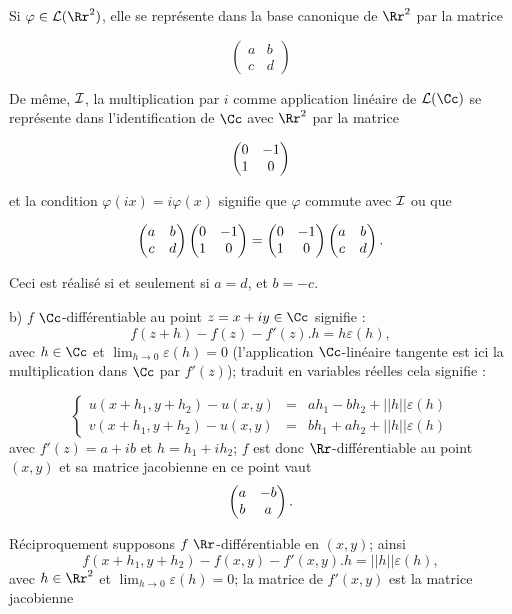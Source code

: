 {\begin{enumerate}
{\medskip

Si $\varphi\in{\cal L}(\Rr^2)$, elle se représente dans la base canonique
de $\Rr^2$ par la matrice 

$$\begin{pmatrix}a&b\\ c&d \end{pmatrix}$$

De même, $\cal I$, la multiplication par $i$ comme application linéaire de 
${\cal L}(\Cc)$ se représente dans l'identification de $\Cc$ avec $\Rr^2$
par la matrice

$$\begin{pmatrix}0&-1\cr 1&0 \cr \end{pmatrix}$$

et la condition  $\varphi(ix)=i\varphi(x)$ signifie que $\varphi$ commute
avec $\cal I$ ou que 

$$\begin{pmatrix}a&b\cr c&d \cr\end{pmatrix}
\begin{pmatrix}0&-1\cr 1&0 \cr \end{pmatrix}=
\begin{pmatrix}0&-1\cr 1&0 \cr\end{pmatrix}
\begin{pmatrix}a&b\cr c&d \cr \end{pmatrix}.$$

Ceci est réalisé si et seulement si $a=d$, et $b=-c$.

\smallskip

b) $f$ $\Cc$-différentiable au point $z=x+iy\in \Cc$ signifie : 
$$f(z+h)-f(z)-f'(z).h=h\varepsilon(h),$$ avec $h\in\Cc$ et $\lim_{h\to
0}\varepsilon(h)=0$ (l'application 
$\Cc$-linéaire tangente est ici la multiplication dans $\Cc$ par $f'(z)$);
traduit en variables réelles cela signifie :

$$\left \{
\begin{array}{ccc} 
u(x+h_1,y+h_2)-u(x,y)&=&ah_1-bh_2+ ||h||
\varepsilon(h)\\
v(x+h_1,y+h_2)-u(x,y)&=&bh_1+ah_2+ ||h||
\varepsilon(h)
\end{array}\right.$$
avec $f'(z)=a+ib$ et $h=h_1+ih_2$; 
$f$ est donc $\Rr$-différentiable au point $(x,y)$  et sa
matrice jacobienne en ce point vaut 
$$\begin{pmatrix}a&-b\cr b&a \cr \end{pmatrix}.$$

Réciproquement supposons $f\  \Rr$-différentiable
en $(x,y)$; ainsi
$$f(x+h_1,y+h_2)-f(x,y)-f'(x,y).h=||h||
\varepsilon(h),$$
avec
$h\in\Rr^2$ et $\lim_{h\to
0}\varepsilon(h)=0$; la matrice de $f'(x,y)$ est la matrice jacobienne 

}
\end{enumerate}}

